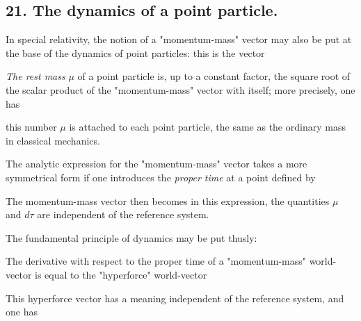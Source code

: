 \subsection*{21. The dynamics of a point particle.}

In special relativity, the notion of a "momentum-mass" vector may also be put at the base of the dynamics of point particles: this is the vector


\textit{The rest mass} $\mu$ of a point particle is, up to a constant factor, the square root of the scalar product of the "momentum-mass" vector with itself; more precisely, one has

this number $\mu$ is attached to each point particle, the same as the ordinary mass in classical mechanics.

The analytic expression for the "momentum-mass" vector takes a more symmetrical form if one introduces the \textit{proper time} at a point defined by


The momentum-mass vector then becomes
in this expression, the quantities $\mu$ and $d\tau$ are independent of the reference system.

The fundamental principle of dynamics may be put thusly:

The derivative with respect to the proper time of a "momentum-mass" world-vector is equal to the "hyperforce" world-vector


This hyperforce vector has a meaning independent of the reference system, and one has


